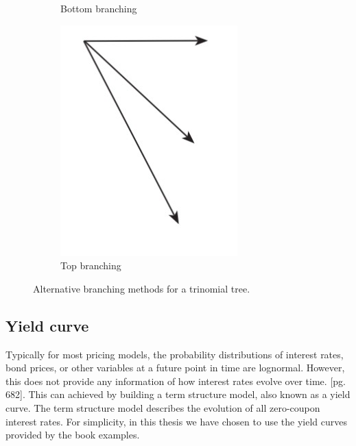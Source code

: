 \begin{figure}[H]
\begin{subfigure}{.3\textwidth}
  \caption{Bottom branching}
  \label{fig:background:altbranchingbottom}
\end{subfigure}
\begin{subfigure}{.3\textwidth}
  \centering
  \includegraphics[width=.7\linewidth]{img/topbranch.jpg}
  \caption{Top branching}
  \label{fig:background:altbranchingtop}
\end{subfigure}
\caption{Alternative branching methods for a trinomial tree.}
\label{fig:background:allbranchings}
\end{figure}

\subsection{Yield curve}
Typically for most pricing models, the probability distributions of interest rates, bond prices, or other variables at a future point in time are lognormal. However, this does not provide any information of how interest rates evolve over time. \cite{ofod}[pg. 682]. This can achieved by building a term structure model, also known as a yield curve. The term structure model describes the evolution of all zero-coupon interest rates. For simplicity, in this thesis we have chosen to use the yield curves provided by the book examples.

